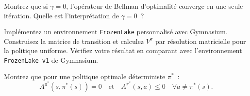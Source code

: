 \begin{exercice}
Montrez que si $\gamma = 0$, l'op\'erateur de Bellman d'optimalit\'e converge
en une seule it\'eration. Quelle est l'interpr\'etation de $\gamma = 0$~?
\end{exercice}

\begin{exercice}
Impl\'ementez un environnement \texttt{FrozenLake} personnalis\'e avec Gymnasium.
Construisez la matrice de transition et calculez $V^\pi$ par r\'esolution
matricielle pour la politique uniforme. V\'erifiez votre r\'esultat en comparant
avec l'environnement \texttt{FrozenLake-v1} de Gymnasium.
\end{exercice}

\begin{exercice}
Montrez que pour une politique optimale d\'eterministe $\pi^*$~:
\[
    A^{\pi^*}(s, \pi^*(s)) = 0 \quad \text{et} \quad A^{\pi^*}(s, a) \leq 0
    \quad \forall a \neq \pi^*(s).
\]
\end{exercice}
